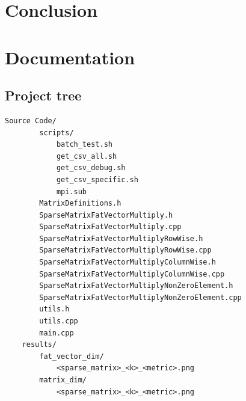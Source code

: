 \documentclass[12pt,oneside]{book} %
\begin{document}
\chapter{Conclusion}




\appendix
\chapter{Documentation}

\begin{subappendices}
    \section{Project tree}
    \begin{lstlisting}[breaklines=true, basicstyle=\small]
    Source Code/
        scripts/
            batch_test.sh
            get_csv_all.sh
            get_csv_debug.sh
            get_csv_specific.sh
            mpi.sub
        MatrixDefinitions.h
        SparseMatrixFatVectorMultiply.h
        SparseMatrixFatVectorMultiply.cpp
        SparseMatrixFatVectorMultiplyRowWise.h
        SparseMatrixFatVectorMultiplyRowWise.cpp
        SparseMatrixFatVectorMultiplyColumnWise.h
        SparseMatrixFatVectorMultiplyColumnWise.cpp
        SparseMatrixFatVectorMultiplyNonZeroElement.h
        SparseMatrixFatVectorMultiplyNonZeroElement.cpp
        utils.h
        utils.cpp
        main.cpp
    results/
        fat_vector_dim/
            <sparse_matrix>_<k>_<metric>.png
        matrix_dim/
            <sparse_matrix>_<k>_<metric>.png
    \end{lstlisting}


\end{subappendices}
\end{document}
